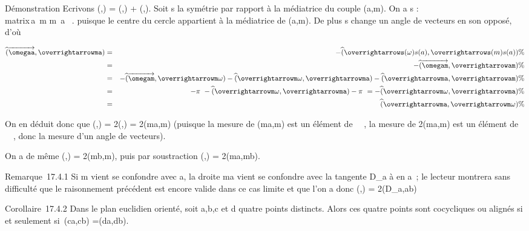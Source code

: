 \documentclass[]{article}
\begin{document}
Démonstration Ecrivons
\widehat(\overrightarrow\omegaa,\overrightarrowm\omega)
=\widehat
(\overrightarrow\omegaa,\overrightarrowma)
+\widehat
(\overrightarrowma,\overrightarrowm\omega).
Soit s la symétrie par rapport à la médiatrice du couple (a,m). On a s :
\left
\\matrix\,a\mapsto~m
\cr m\mapsto~a \cr
\omega\mapsto~\omega\right . puisque le
centre du cercle appartient à la médiatrice de (a,m). De plus s change
un angle de vecteurs en son opposé, d'où

\begin{align*}
\widehat(\overrightarrow\omegaa,\overrightarrowma)&
=&
-\widehat(\overrightarrows(\omega)s(a),\overrightarrows(m)s(a))
\%& \\ & =&
-\widehat(\overrightarrow\omegam,\overrightarrowam)
\%& \\ & =&
-\widehat(\overrightarrow\omegam,\overrightarrowm\omega)
-\widehat
(\overrightarrowm\omega,\overrightarrowma)
-\widehat
(\overrightarrowma,\overrightarrowam)\%&
\\ & =& -\pi~ -\widehat
(\overrightarrowm\omega,\overrightarrowma)
- \pi~ =
-\widehat(\overrightarrowm\omega,\overrightarrowma)
\%& \\ & =&
\widehat(\overrightarrowma,\overrightarrowm\omega)
\%& \\ \end{align*}

On en déduit donc que
\widehat(\overrightarrow\omegaa,\overrightarrowm\omega)
=
2\widehat(\overrightarrowma,\overrightarrowm\omega)
= 2\widehat(ma,m\omega) (puisque la mesure de
\widehat(ma,m\omega) est un élément de ~\diagup\pi~, la mesure de
2\widehat(ma,m\omega) est un élément de ~\pi~, donc la
mesure d'un angle de vecteurs).

On a de même
\widehat(\overrightarrow\omegab,\overrightarrowm\omega)
= 2\widehat(mb,m\omega), puis par soustraction
\widehat(\overrightarrow\omegaa,\overrightarrow\omegab)
= 2\widehat(ma,mb).

Remarque~17.4.1 Si m vient se confondre avec a, la droite ma vient se
confondre avec la tangente D_a à \Gamma en a~; le lecteur montrera
sans difficulté que le raisonnement précédent est encore valide dans ce
cas limite et que l'on a donc
\widehat(\overrightarrow\omegaa,\overrightarrow\omegab)
= 2\widehat(D_a,ab)

Corollaire~17.4.2 Dans le plan euclidien orienté, soit a,b,c et d quatre
points distincts. Alors ces quatre points sont cocycliques ou alignés si
et seulement si~\widehat(ca,cb)
=\widehat (da,db).
\end{document}
